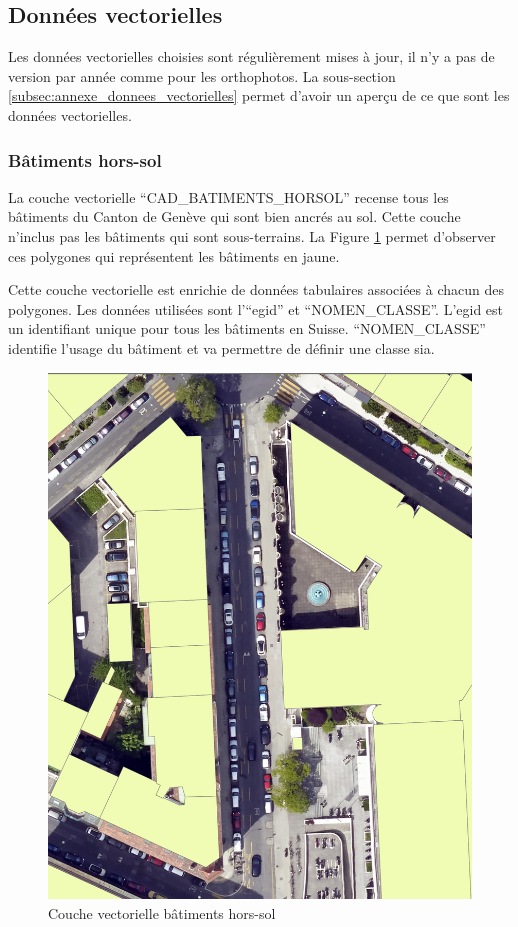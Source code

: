 \newpage
\subsection{Données vectorielles}
Les données vectorielles choisies sont régulièrement mises à jour, il n'y a pas de version par année comme pour les orthophotos. La sous-section \ref{subsec:annexe_donnees_vectorielles} permet d'avoir un aperçu de ce que sont les données vectorielles.
\subsubsection{Bâtiments hors-sol}
La couche vectorielle ``CAD\_BATIMENTS\_HORSOL'' \cite{sitg_batiments_nodate} recense tous les bâtiments du Canton de Genève qui sont bien ancrés au sol. Cette couche n'inclus pas les bâtiments qui sont sous-terrains. La Figure \ref{fig:ch3_dataset_methodo_02_batiment_horsol} permet d'observer ces polygones qui représentent les bâtiments en jaune.

Cette couche vectorielle est enrichie de données tabulaires associées à chacun des polygones. Les données utilisées sont l'``\gls{egid}'' et ``NOMEN\_CLASSE''. L'\gls{egid} est un identifiant unique pour tous les bâtiments en Suisse. ``NOMEN\_CLASSE'' identifie l'usage du bâtiment et va permettre de définir une classe \gls{sia}.

\begin{figure}[H]
    \centering
    \includegraphics[width=1\linewidth]{02-main//figures/ch3/ch3_dataset_methodo_02_batiment_horsol.png}
    \caption{Couche vectorielle bâtiments hors-sol}
    \label{fig:ch3_dataset_methodo_02_batiment_horsol}
\end{figure}


